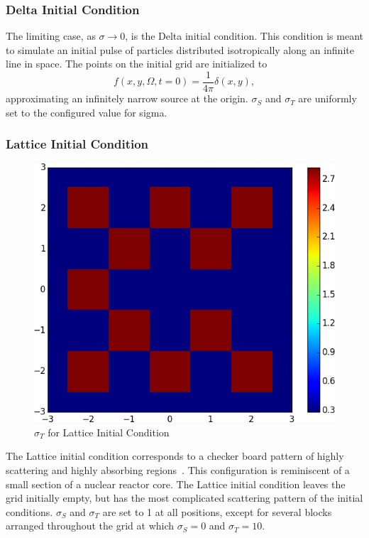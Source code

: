 \documentclass{article}
\begin{document}
\subsubsection{Delta Initial Condition}
The limiting case, as $\sigma \to 0$, is the Delta initial condition.
This condition is meant to simulate an initial pulse of particles distributed
isotropically along an infinite line in space. The points on the initial grid
are initialized to
\begin{equation}
    f(x,y,\Omega,t=0) = \frac{1}{4\pi} \delta(x,y),
\end{equation}
approximating an infinitely narrow source at the origin. 
$\sigma_S$ and $\sigma_T$ are uniformly set to the configured
value for sigma.

\subsubsection{Lattice Initial Condition}
\begin{figure}
    \centering
    \includegraphics[height=0.3\textheight]{initcond_lattice-t.png}
    \caption{$\sigma_T$ for Lattice Initial Condition}
    \label{fig:lattice_ic}
\end{figure}
The Lattice initial condition corresponds to a checker board pattern
of highly scattering and highly absorbing regions~\cite{Brunner-Holloway-2005,Brunner-2002}.
This configuration is reminiscent of a
small section of a nuclear reactor core. The Lattice initial condition leaves the
grid initially empty, but has the most complicated scattering pattern of the initial
conditions. $\sigma_S$ and $\sigma_T$ are set to 1 at all positions, except
for several blocks arranged throughout the grid at which $\sigma_S=0$ and
$\sigma_T=10$.
\end{document}
